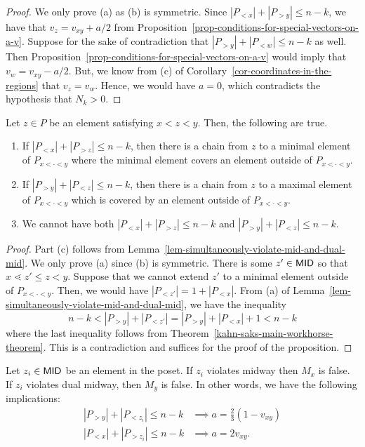 \documentclass{puthesis-UG}
\begin{document}
\begin{proof}
	We only prove (a) as (b) is symmetric. Since $|P_{< x}| + |P_{> y}| \leq n-k$, we have that $v_z = v_{xy} + a/2$ from Proposition~\ref{prop-conditions-for-special-vectors-on-a-v}. Suppose for the sake of contradiction that $|P_{>y}| + |P_{< w}| \leq n-k$ as well. Then Proposition~\ref{prop-conditions-for-special-vectors-on-a-v} would imply that $v_w = v_{xy} - a/2$. But, we know from (c) of Corollary~\ref{cor-coordinates-in-the-regions} that $v_z = v_w$. Hence, we would have $a = 0$, which contradicts the hypothesis that $N_k > 0$. 
\end{proof}

\begin{prop} \label{prop-connective-alan-kahn-saks}
	Let $z \in P$ be an element satisfying $x < z < y$. Then, the following are true. 
	\begin{enumerate}[label = (\alph*)]
		\item If $|P_{< x}| + |P_{> z}| \leq n-k$, then there is a chain from $z$ to a minimal element of $P_{x < \cdot < y}$ where the minimal element covers an element outside of $P_{x < \cdot < y}$. 
		\item If $|P_{> y}| + |P_{< z}| \leq n-k$, then there is a chain from $z$ to a maximal element of $P_{x < \cdot < y}$ which is covered by an element outside of $P_{x < \cdot < y}$. 
		\item We cannot have both $|P_{< x}| + |P_{> z}| \leq n-k$ and $|P_{> y}| + |P_{< z}| \leq n-k$.  
	\end{enumerate}
\end{prop}

\begin{proof}
 	Part (c) follows from Lemma~\ref{lem-simultaneously-violate-mid-and-dual-mid}. We only prove (a) since (b) is symmetric. There is some $z' \in \mathsf{MID}$ so that $x \lessdot z' \leq z < y$. Suppose that we cannot extend $z'$ to a minimal element outside of $P_{x< \cdot < y}$. Then, we would have $|P_{< z'}| = 1 + |P_{< x}|$. From (a) of Lemma~\ref{lem-simultaneously-violate-mid-and-dual-mid}, we have the inequality 
 	\[
 		n-k < |P_{> y}| + |P_{< z'}| = |P_{> y}| + |P_{< x}| + 1 < n-k
 	\]
 	where the last inequality follows from Theorem~\ref{kahn-saks-main-workhorse-theorem}. This is a contradiction and suffices for the proof of the proposition. 
\end{proof}

\begin{lem} \label{lem-midway-then-mx-false-and-other-version}
	Let $z_i \in \mathsf{MID}$ be an element in the poset. If $z_i$ violates midway then $M_x$ is false. If $z_i$ violates dual midway, then $M_y$ is false. In other words, we have the following implications:
	\begin{align*}
		|P_{> y}| + |P_{< z_i}| \leq n-k & \implies a = \frac{2}{3} (1 - v_{xy}) \\
		|P_{< x}| + |P_{> z_i}| \leq n-k & \implies a = 2v_{xy}. 
	\end{align*}
\end{lem}
\end{document}
